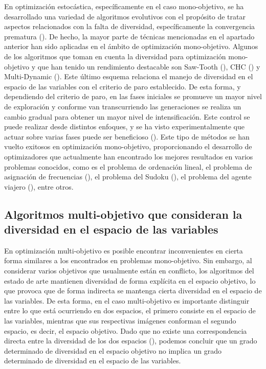 En optimización estocástica, específicamente en el caso mono-objetivo, se ha desarrollado una variedad de algoritmos evolutivos 
con el propósito de tratar aspectos relacionados con la falta de diversidad, específicamente la convergencia 
prematura (\cite{Joel:Crepinsek}).
%
De hecho, la mayor parte de técnicas mencionadas en el apartado anterior han sido aplicadas en el ámbito de optimización
mono-objetivo.
%
Algunos de los algoritmos que toman en cuenta la diversidad para optimización mono-objetivo y que han tenido un rendimiento
destacable son Saw-Tooth (\cite{Joel:SAWTOOTH}), CHC (\cite{Joel:CHC}) y Multi-Dynamic (\cite{Joel:MULTI_DYNAMIC}).
%
Este último esquema relaciona el manejo de diversidad en el espacio de las variables con el criterio de paro establecido. 
%
De esta forma, y dependiendo del criterio de paro, en las fases iniciales se promueve un mayor nivel de exploración y 
conforme van transcurriendo las generaciones se realiza un cambio gradual para obtener un mayor nivel de intensificación.
%
Este control se puede realizar desde distintos enfoques, y se ha visto experimentalmente que actuar sobre varias fases puede 
ser beneficioso (\cite{Joel:ANovelDiversityBasedEAForTheTSP}).
%
Este tipo de métodos se han vuelto exitosos en optimización mono-objetivo, proporcionando el desarrollo de optimizadores 
que actualmente han encontrado los mejores resultados en varios problemas conocidos, como es el problema de ordenación lineal, 
el problema de asignación de frecuencias  (\cite{Joel:Dynamic_FAP}), 
el problema del Sudoku  (\cite{Joel:Dynamic_Sudoku}), 
el problema del agente viajero  (\cite{Joel:ANovelDiversityBasedEAForTheTSP}), 
entre otros.

\subsection{Algoritmos multi-objetivo que consideran la diversidad en el espacio de las variables}

En optimización multi-objetivo es posible encontrar inconvenientes en cierta forma similares a los encontrados en 
problemas mono-objetivo.
%
Sin embargo, al considerar varios objetivos que usualmente están en conflicto, los algoritmos del estado de arte
mantienen diversidad de forma explícita en el espacio objetivo, lo que provoca que de forma indirecta se mantenga
cierta diversidad en el espacio de las variables.
%
De esta forma, en el caso multi-objetivo es importante distinguir entre lo que está ocurriendo en dos espacios, el primero 
consiste en el espacio de las variables, mientras que sus respectivas imágenes conforman el segundo espacio, es decir,
el espacio objetivo.
%
Dado que no existe una correspondencia directa entre la diversidad de los dos espacios (\cite{shir2009enhancing}), 
podemos concluir que un grado determinado de diversidad en el espacio objetivo no implica un grado determinado de diversidad 
en el espacio de las variables.

